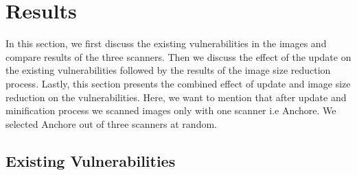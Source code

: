 \documentclass[a4paper,num-refs]{oup-contemporary}
\begin{document}

\section{Results}

In this section,
we first discuss the existing vulnerabilities in the images and compare
results of the three scanners. Then we discuss the effect of the update on the
existing vulnerabilities followed by the results of the image size reduction
process. Lastly, this section presents the combined effect of update and image size reduction on the
vulnerabilities. Here, we want to mention that after update and minification process we scanned
images only with one scanner i.e Anchore. We selected Anchore out of three scanners at random.

\subsection{Existing Vulnerabilities}
\end{document}
